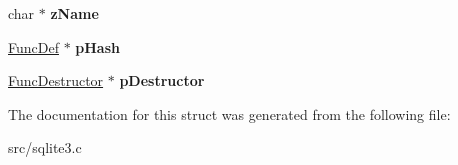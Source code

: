 \begin{DoxyCompactItemize}
\item 
\hypertarget{struct_func_def_a1135e622a3a505c7c463e975846ef926}{char $\ast$ {\bfseries z\-Name}}\label{struct_func_def_a1135e622a3a505c7c463e975846ef926}

\item 
\hypertarget{struct_func_def_a04561444155a6922d6a2d99a29d35281}{\hyperlink{struct_func_def}{Func\-Def} $\ast$ {\bfseries p\-Hash}}\label{struct_func_def_a04561444155a6922d6a2d99a29d35281}

\item 
\hypertarget{struct_func_def_a1bd12675375b838b5c00b1c79c1e6301}{\hyperlink{struct_func_destructor}{Func\-Destructor} $\ast$ {\bfseries p\-Destructor}}\label{struct_func_def_a1bd12675375b838b5c00b1c79c1e6301}

\end{DoxyCompactItemize}


The documentation for this struct was generated from the following file\-:\begin{DoxyCompactItemize}
\item 
src/sqlite3.\-c\end{DoxyCompactItemize}
